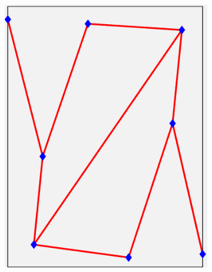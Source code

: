 \documentclass[11pt,letterpaper]{article}
\begin{document}
\begin{figure}[!h]
\begin{subfigure}{0.2\textwidth}
\includegraphics[width=\linewidth]{parallelTwoPareto_sim12.eps}
\caption{}
\end{subfigure}
\begin{subfigure}{0.2\textwidth}

\end{subfigure}
\end{figure}
\end{document}
